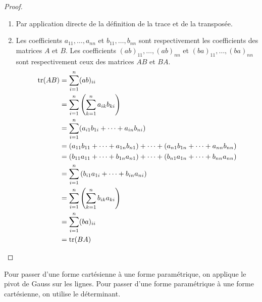 \begin{proof}
	\leavevmode
    \begin{enumerate}
        \item Par application directe de la définition de la trace et de la transposée.
        \item Les coefficients $a_{11}, \ldots, a_{nn}$ et $b_{11}, \ldots, b_{nn}$ sont respectivement les coefficients des matrices $A$ et $B$. Les coefficients $(ab)_{11}, \ldots, (ab)_{nn}$ et $(ba)_{11}, \ldots, (ba)_{nn}$ sont respectivement ceux des matrices $AB$ et $BA$.
        \begin{align*}
        	\tr(AB) &= \sum_{i=1}^n (ab)_{ii} \\
        			&= \sum_{i=1}^n \left( \sum_{k=1}^n a_{ik} b_{ki} \right) \\
        			&= \sum_{i=1}^n (a_{i1} b_{1i} + \cdots + a_{in} b_{ni}) \\
        			&= (a_{11} b_{11} + \cdots + a_{1n} b_{n1}) + \cdots + (a_{n1} b_{1n} + \cdots + a_{nn} b_{nn}) \\
        			&= (b_{11}a_{11} + \cdots + b_{1n}a_{n1}) + \cdots + (b_{n1} a_{1n} + \cdots + b_{nn} a_{nn}) \\
        			&= \sum_{i=1}^n \left( b_{i1} a_{1i} + \cdots + b_{in} a_{ni} \right) \\
        			&= \sum_{i=1}^n \left( \sum_{k=1}^n b_{ik} a_{ki} \right) \\
        			&= \sum_{i=1}^n (ba)_{ii} \\
        			&= \tr(BA)
        \end{align*}
    \end{enumerate}
\end{proof}

\begin{proposition}
    Pour passer d'une forme cartésienne à une forme paramétrique, on applique le pivot de Gauss sur les lignes.
    Pour passer d'une forme paramétrique à une forme cartésienne, on utilise le déterminant.
\end{proposition}
